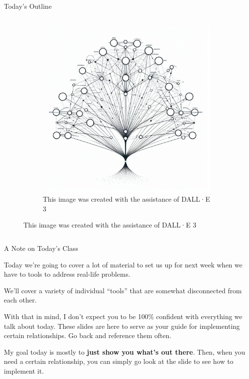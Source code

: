 \documentclass[10pt, aspectratio=169]{beamer}
\begin{document}
\begin{frame}{Today's Outline}
\begin{columns}
\begin{column}{0.5\textwidth}
\begin{figure}
\begin{figure}
                    \includegraphics[width=0.95\linewidth]{DecisionTree.png}
                    \caption{This image was created with the assistance of DALL·E 3}
                \end{figure}
            \end{figure}
        \end{column}
    \end{columns}
\end{frame}

\begin{frame}{A Note on Today's Class}
    \begin{center}
        Today we're going to cover a lot of material to set us up for next week when we have to tools to address real-life problems.

        \vspace{1cm}

        We'll cover a variety of individual \enquote{tools} that are somewhat disconnected from each other.

        \vspace{1cm}

        With that in mind, I don't expect you to be 100\% confident with everything we talk about today. These slides are here to serve as your guide for implementing certain relationships. Go back and reference them often.

        \vspace{1cm}

        My goal today is mostly to \textbf{just show you what's out there}. Then, when you need a certain relationship, you can simply go look at the slide to see how to implement it.
    \end{center}
\end{frame}
\end{document}

